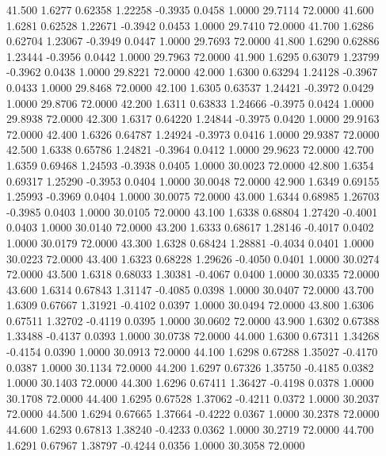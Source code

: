   41.500   1.6277   0.62358   1.22258  -0.3935   0.0458   1.0000  29.7114  72.0000
  41.600   1.6281   0.62528   1.22671  -0.3942   0.0453   1.0000  29.7410  72.0000
  41.700   1.6286   0.62704   1.23067  -0.3949   0.0447   1.0000  29.7693  72.0000
  41.800   1.6290   0.62886   1.23444  -0.3956   0.0442   1.0000  29.7963  72.0000
  41.900   1.6295   0.63079   1.23799  -0.3962   0.0438   1.0000  29.8221  72.0000
  42.000   1.6300   0.63294   1.24128  -0.3967   0.0433   1.0000  29.8468  72.0000
  42.100   1.6305   0.63537   1.24421  -0.3972   0.0429   1.0000  29.8706  72.0000
  42.200   1.6311   0.63833   1.24666  -0.3975   0.0424   1.0000  29.8938  72.0000
  42.300   1.6317   0.64220   1.24844  -0.3975   0.0420   1.0000  29.9163  72.0000
  42.400   1.6326   0.64787   1.24924  -0.3973   0.0416   1.0000  29.9387  72.0000
  42.500   1.6338   0.65786   1.24821  -0.3964   0.0412   1.0000  29.9623  72.0000
  42.700   1.6359   0.69468   1.24593  -0.3938   0.0405   1.0000  30.0023  72.0000
  42.800   1.6354   0.69317   1.25290  -0.3953   0.0404   1.0000  30.0048  72.0000
  42.900   1.6349   0.69155   1.25993  -0.3969   0.0404   1.0000  30.0075  72.0000
  43.000   1.6344   0.68985   1.26703  -0.3985   0.0403   1.0000  30.0105  72.0000
  43.100   1.6338   0.68804   1.27420  -0.4001   0.0403   1.0000  30.0140  72.0000
  43.200   1.6333   0.68617   1.28146  -0.4017   0.0402   1.0000  30.0179  72.0000
  43.300   1.6328   0.68424   1.28881  -0.4034   0.0401   1.0000  30.0223  72.0000
  43.400   1.6323   0.68228   1.29626  -0.4050   0.0401   1.0000  30.0274  72.0000
  43.500   1.6318   0.68033   1.30381  -0.4067   0.0400   1.0000  30.0335  72.0000
  43.600   1.6314   0.67843   1.31147  -0.4085   0.0398   1.0000  30.0407  72.0000
  43.700   1.6309   0.67667   1.31921  -0.4102   0.0397   1.0000  30.0494  72.0000
  43.800   1.6306   0.67511   1.32702  -0.4119   0.0395   1.0000  30.0602  72.0000
  43.900   1.6302   0.67388   1.33488  -0.4137   0.0393   1.0000  30.0738  72.0000
  44.000   1.6300   0.67311   1.34268  -0.4154   0.0390   1.0000  30.0913  72.0000
  44.100   1.6298   0.67288   1.35027  -0.4170   0.0387   1.0000  30.1134  72.0000
  44.200   1.6297   0.67326   1.35750  -0.4185   0.0382   1.0000  30.1403  72.0000
  44.300   1.6296   0.67411   1.36427  -0.4198   0.0378   1.0000  30.1708  72.0000
  44.400   1.6295   0.67528   1.37062  -0.4211   0.0372   1.0000  30.2037  72.0000
  44.500   1.6294   0.67665   1.37664  -0.4222   0.0367   1.0000  30.2378  72.0000
  44.600   1.6293   0.67813   1.38240  -0.4233   0.0362   1.0000  30.2719  72.0000
  44.700   1.6291   0.67967   1.38797  -0.4244   0.0356   1.0000  30.3058  72.0000
